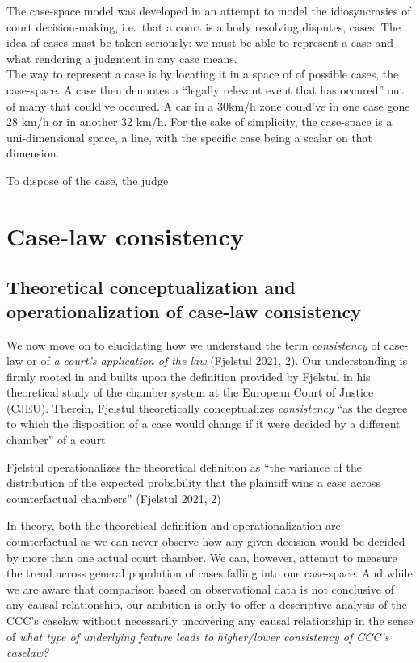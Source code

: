 \documentclass[
  11pt,
]{article}
\begin{document}
The case-space model was developed in an attempt to model the
idiosyncrasies of court decision-making, i.e.~that a court is a body
resolving disputes, cases. The idea of cases must be taken seriously: we
must be able to represent a case and what rendering a judgment in any
case means.\\
The way to represent a case is by locating it in a space of of possible
cases, the case-space. A case then dennotes a ``legally relevant event
that has occured'' out of many that could've occured. A car in a 30km/h
zone could've in one case gone 28 km/h or in another 32 km/h. For the
sake of simplicity, the case-space is a uni-dimensional space, a line,
with the specific case being a scalar on that dimension.

To dispose of the case, the judge

\hypertarget{case-law-consistency}{%
\section{Case-law consistency}\label{case-law-consistency}}

\hypertarget{theoretical-conceptualization-and-operationalization-of-case-law-consistency}{%
\subsection{Theoretical conceptualization and operationalization of
case-law
consistency}\label{theoretical-conceptualization-and-operationalization-of-case-law-consistency}}

We now move on to elucidating how we understand the term
\emph{consistency} of case-law or of \emph{a court's application of the
law} (Fjelstul 2021, 2). Our understanding is firmly rooted in and
builts upon the definition provided by Fjelstul in his theoretical study
of the chamber system at the European Court of Justice (CJEU). Therein,
Fjelstul theoretically conceptualizes \emph{consistency} ``as the degree
to which the disposition of a case would change if it were decided by a
different chamber'' of a court.

Fjelstul operationalizes the theoretical definition as ``the variance of
the distribution of the expected probability that the plaintiff wins a
case across counterfactual chambers'' (Fjelstul 2021, 2)

In theory, both the theoretical definition and operationalization are
counterfactual as we can never observe how any given decision would be
decided by more than one actual court chamber. We can, however, attempt
to measure the trend across general population of cases falling into one
case-space. And while we are aware that comparison based on
observational data is not conclusive of any causal relationship, our
ambition is only to offer a descriptive analysis of the CCC's caselaw
without necessarily uncovering any causal relationship in the sense of
\emph{what type of underlying feature leads to higher/lower consistency
of CCC's caselaw?}
\end{document}
